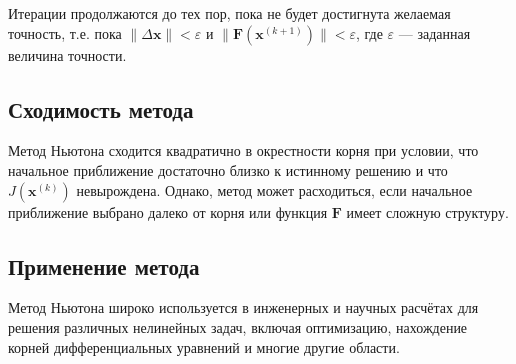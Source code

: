 Итерации продолжаются до тех пор, пока не будет достигнута желаемая точность, т.е. пока \( \|\Delta \mathbf{x}\| < \varepsilon \) и \( \|\mathbf{F}(\mathbf{x}^{(k+1)})\| < \varepsilon \), где \( \varepsilon \) — заданная величина точности.

\subsection{Сходимость метода}

Метод Ньютона сходится квадратично в окрестности корня при условии, что начальное приближение достаточно близко к истинному решению и что \( J(\mathbf{x}^{(k)}) \) невырождена. Однако, метод может расходиться, если начальное приближение выбрано далеко от корня или функция \( \mathbf{F} \) имеет сложную структуру.

\subsection{Применение метода}

Метод Ньютона широко используется в инженерных и научных расчётах для решения различных нелинейных задач, включая оптимизацию, нахождение корней дифференциальных уравнений и многие другие области.
